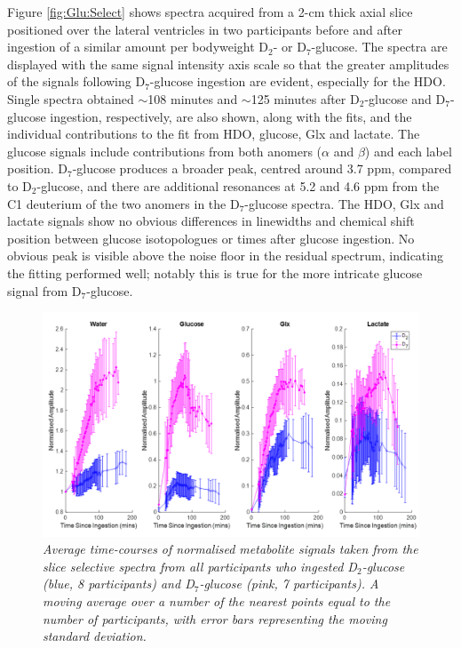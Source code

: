 Figure \ref{fig:Glu:Select} shows spectra acquired from a 2-cm thick axial slice positioned over the lateral ventricles in two participants before and after ingestion of a similar amount per bodyweight D$_2$- or D$_7$-glucose. The spectra are displayed with the same signal intensity axis scale so that the greater amplitudes of the signals following D$_7$-glucose ingestion are evident, especially for the \ac{HDO}. Single spectra obtained $\sim$108 minutes and $\sim$125 minutes after D$_2$-glucose and D$_7$-glucose ingestion, respectively, are also shown, along with the fits, and the individual contributions to the fit from \ac{HDO}, glucose, Glx and lactate. The glucose signals include contributions from both anomers ($\alpha$ and $\beta$) and each label position. D$_7$-glucose produces a broader peak, centred around 3.7 ppm, compared to D$_2$-glucose, and there are additional resonances at 5.2 and 4.6 ppm from the C1 deuterium of the two anomers in the D$_7$-glucose spectra. The \ac{HDO}, Glx and lactate signals show no obvious differences in linewidths and chemical shift position between glucose isotopologues or times after glucose ingestion. No obvious peak is visible above the noise floor in the residual spectrum, indicating the fitting performed well; notably this is true for the more intricate glucose signal from D$_7$-glucose.

\begin{figure}
    \centering
    \includegraphics[width = 1\textwidth]{Figures/Glucose/Bulk_Time.png}
    \caption{\textit{Average time-courses of normalised metabolite signals taken from the slice selective spectra from all participants who ingested D$_2$-glucose (blue, 8 participants) and D$_7$-glucose (pink, 7 participants). A moving average over a number of the nearest points equal to the number of participants, with error bars representing the moving standard deviation.}}
    \label{fig:Glu:Select_Time}
\end{figure}

